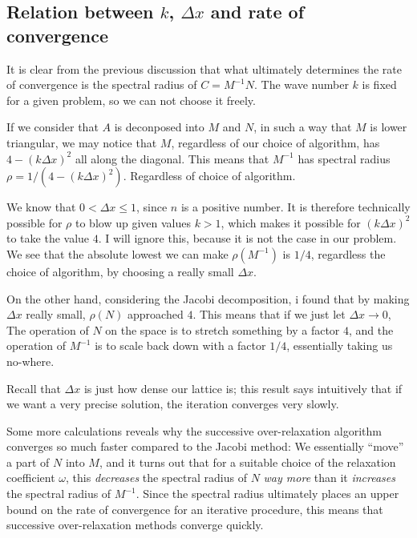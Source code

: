 \documentclass[12pt]{article}
\begin{document}
\begin{multicols*}{2}
    \subsection{Relation between $k$, $\Delta x$ and rate of convergence}
    It is clear from the previous discussion that what ultimately determines
    the rate of convergence is the spectral radius of $C = M^{-1}N$.
    The wave number $k$ is fixed for a given problem,
    so we can not choose it freely.

    If we consider that $A$ is deconposed into $M$ and $N$,
    in such a way that $M$ is lower triangular,
    we may notice that $M$, regardless of our choice of
    algorithm, has $4 - (k\Delta x)^2$ all along the diagonal.
    This means that $M^{-1}$ has spectral radius
    $\rho = 1 / \left(4 - (k\Delta x)^2\right)$.
    Regardless of choice of algorithm.

    We know that $0 < \Delta x \leq 1$, since $n$ is a positive number.
    It is therefore technically possible for $\rho$ to blow up given
    values $k > 1$, which makes it possible for $(k\Delta x)^2$
    to take the value $4$. I will ignore this, because it is not
    the case in our problem.
    We see that the absolute lowest we can make $\rho(M^{-1})$ is
    $1/4$, regardless the choice of algorithm, by choosing a really
    small $\Delta x$.

    On the other hand, considering the Jacobi decomposition, i found
    that by making $\Delta x$ really small, $\rho(N)$ approached $4$.
    This means that if we just let $\Delta x \longrightarrow 0$,
    The operation of $N$ on the space is to stretch something by a
    factor $4$, and the operation of $M^{-1}$ is to scale back down
    with a factor $1/4$, essentially taking us no-where.

    Recall that $\Delta x$ is just how dense our lattice is;
    this result says intuitively that if we want a very precise solution,
    the iteration converges very slowly.

    Some more calculations reveals why the successive over-relaxation
    algorithm converges so much faster compared to the Jacobi method:
    We essentially ``move'' a part of $N$ into $M$,
    and it turns out that for a suitable
    choice of the relaxation coefficient $\omega$,
    this {\em decreases} the spectral radius of $N$ {\em way more}
    than it {\em increases} the spectral radius of $M^{-1}$.
    Since the spectral radius ultimately places an upper bound on the
    rate of convergence for an iterative procedure, this means
    that successive over-relaxation methods converge quickly.



\end{multicols*}
\end{document}
